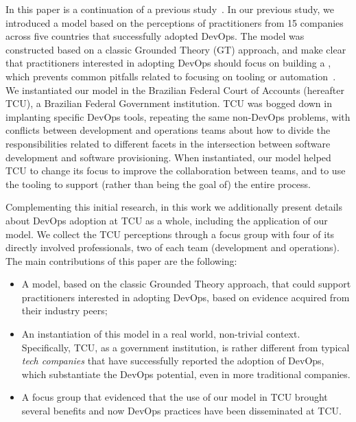 In this paper is a continuation of a previous study~\cite{Luz:2018:ESEM}.
In our previous study, we introduced a model based on the perceptions of practitioners from
15 companies across five countries that successfully adopted DevOps. The model
was constructed based on a classic Grounded Theory (GT) approach,
and make clear that practitioners interested in adopting DevOps should focus on building a
\cc, which prevents common pitfalls related to focusing on tooling or automation~\cite{Kromhout:2017:Queue}.
We instantiated our model in the Brazilian Federal Court of
Accounts (hereafter TCU), a Brazilian Federal Government institution. TCU was
bogged down in implanting specific DevOps tools, repeating the same non-DevOps
problems, with conflicts between development and operations teams about how to
divide the responsibilities related to different facets in the intersection
between software development and software provisioning. When instantiated,
our model helped TCU to change its focus to improve the collaboration between teams, and to use the tooling
to support (rather than being the goal of) the entire process.

Complementing this initial research, in this work we additionally present details
about DevOps adoption at TCU as a whole, including the application of our model.
We collect the TCU perceptions through a focus group with four of its directly
involved professionals, two of each team (development and operations).
The main contributions of this paper are the following:

\begin{itemize}
\item A model, based on the classic Grounded Theory approach, that could support practitioners interested in adopting DevOps,
      based on evidence acquired from their industry peers;
\item An instantiation of this model in a real world, non-trivial context. Specifically, TCU, as a government institution, is rather different from typical \emph{tech companies} that have successfully reported the adoption of DevOps, which substantiate the DevOps potential, even in more traditional companies.
\item A focus group that evidenced that the use of our model in TCU brought several benefits and
now DevOps practices have been disseminated at TCU.
\end{itemize}
